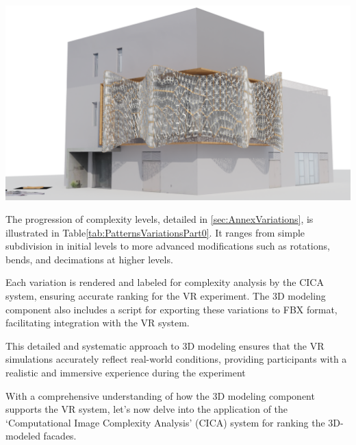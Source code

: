 \begin{table}[!htb]
\begin{tabularx}
              {\includegraphics[width=1\linewidth]{Images/Pattern 3/0009}} \\
            \bottomrule
        \end{tabularx}
    \end{table}

The progression of complexity levels, detailed in \ref{sec:AnnexVariations}, is illustrated in Table\ref{tab:PatternsVariationsPart0}.
It ranges from simple subdivision in initial levels to more advanced modifications such as rotations, bends, and decimations at higher levels.

Each variation is rendered and labeled for complexity analysis by the CICA system, ensuring accurate ranking for the VR experiment.
The 3D modeling component also includes a script for exporting these variations to FBX format, facilitating integration with the VR system.

This detailed and systematic approach to 3D modeling ensures that the VR simulations accurately reflect real-world conditions, providing participants with a realistic and immersive experience during the experiment

With a comprehensive understanding of how the 3D modeling component supports the VR system, let's now delve into the application of the `Computational Image Complexity Analysis' (CICA) system for ranking the 3D-modeled facades.


